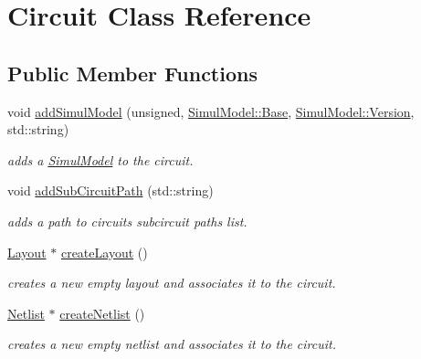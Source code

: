 \hypertarget{class_open_chams_1_1_circuit}{}\section{Circuit Class Reference}
\label{class_open_chams_1_1_circuit}
\subsection*{Public Member Functions}
\begin{DoxyCompactItemize}
\item 
void \mbox{\hyperlink{class_open_chams_1_1_circuit_a7c1c09f44cf215dc17d3dd2518e32389}{add\+Simul\+Model}} (unsigned, \mbox{\hyperlink{class_open_chams_1_1_simul_model_a450696a95d6cb29d7723838846948340}{Simul\+Model\+::\+Base}}, \mbox{\hyperlink{class_open_chams_1_1_simul_model_a2256f5bba1c1c69a92b933aa501df470}{Simul\+Model\+::\+Version}}, std\+::string)
\begin{DoxyCompactList}\small\item\em adds a \mbox{\hyperlink{class_open_chams_1_1_simul_model}{Simul\+Model}} to the circuit. \end{DoxyCompactList}\item 
void \mbox{\hyperlink{class_open_chams_1_1_circuit_a55234deef1d06c617a519a575ce33608}{add\+Sub\+Circuit\+Path}} (std\+::string)
\begin{DoxyCompactList}\small\item\em adds a path to circuit\textquotesingle{}s subcircuit paths list. \end{DoxyCompactList}\item 
\mbox{\hyperlink{class_open_chams_1_1_layout}{Layout}} $\ast$ \mbox{\hyperlink{class_open_chams_1_1_circuit_a725a691b0117c4b913b54e7bfd92832f}{create\+Layout}} ()
\begin{DoxyCompactList}\small\item\em creates a new empty layout and associates it to the circuit. \end{DoxyCompactList}\item 
\mbox{\hyperlink{class_open_chams_1_1_netlist}{Netlist}} $\ast$ \mbox{\hyperlink{class_open_chams_1_1_circuit_a3f11671c7ea7b4e2cc3487bd7954b667}{create\+Netlist}} ()
\begin{DoxyCompactList}\small\item\em creates a new empty netlist and associates it to the circuit. \end{DoxyCompactList}\item 

\end{DoxyCompactItemize}
